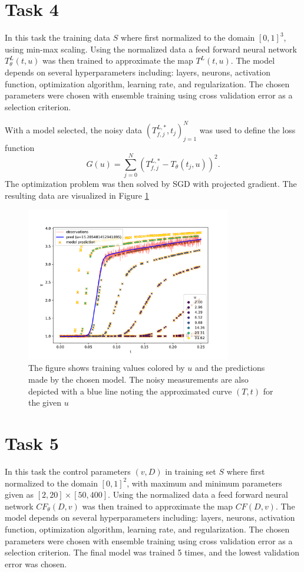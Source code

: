 \documentclass[a4paper]{article}
\begin{document}
\section*{Task 4}
In this task the training data $S$ where first normalized to the domain $[0,1]^3$, using min-max scaling. Using the normalized data a feed forward neural network $T^L_{\theta}(t, u)$ was then trained to approximate the map $T^L(t, u)$. The model depends on several hyperparameters including: layers, neurons, activation function, optimization algorithm, learning rate, and regularization. The chosen parameters were chosen with ensemble training using cross validation error as a selection criterion.

With a model selected, the noisy data $(T_{f,j}^{L,*}, t_j)_{j=1}^{N}$ was used to define the loss function
\begin{equation}
	G(u) = \sum_{j=0}^{N}{(T_{f,j}^{L,*} - T_{\theta}(t_j,u))^2}.
\end{equation}
The optimization problem was then solved by SGD with projected gradient. The resulting data are visualized in Figure \ref{fig:task4}
\begin{figure}[t]
    \centering
    \includegraphics[width=0.8\textwidth]{figures/task4/final.pdf}
    \caption{The figure shows training values colored by $u$ and the predictions made by the chosen model. The noisy measurements are also depicted with a blue line noting the approximated curve $(T,t)$ for the given $u$}
    \label{fig:task4}
\end{figure}

\section*{Task 5}
In this task the control parameters $(v,D)$ in training set $S$ where first normalized to the domain $[0,1]^2$,  with maximum and minimum parameters given as $[2,20]\times[50,400]$. Using the normalized data a feed forward neural network $CF_{\theta}(D, v)$ was then trained to approximate the map $CF(D, v)$. The model depends on several hyperparameters including: layers, neurons, activation function, optimization algorithm, learning rate, and regularization. The chosen parameters were chosen with ensemble training using cross validation error as a selection criterion.  The final model was trained 5 times, and the lowest validation error was chosen. 
\end{document}
